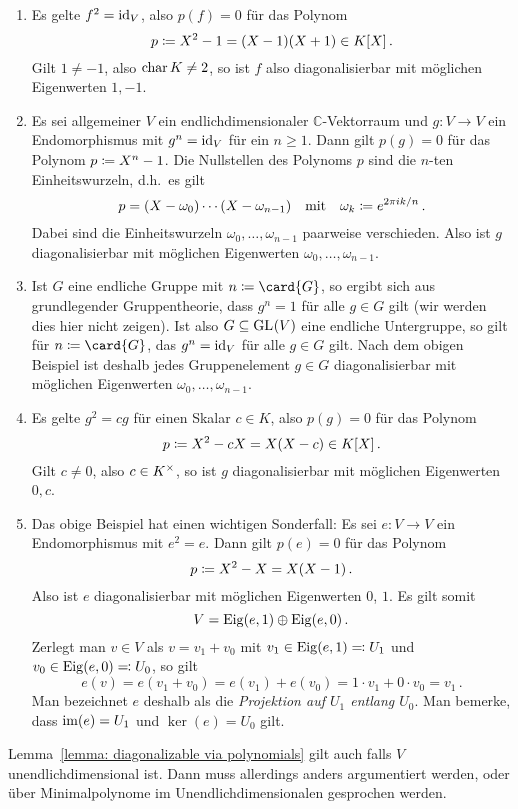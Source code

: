 \begin{example}
  \label{example: diagonalizable via polynomials}
  \leavevmode
  \begin{enumerate}
    \item
      Es gelte $f^2 = \operatorname{id}_V$, also $p(f) = 0$ für das Polynom
      \[
                  p
        \coloneqq  X^2 - 1
        =         (X - 1)(X + 1)
        \in       K[X] \,.
      \]
      Gilt $1 \neq -1$, also $\operatorname{char}{K} \neq 2$, so ist $f$ also diagonalisierbar mit möglichen Eigenwerten $1, -1$.
    \item
      Es sei allgemeiner $V$ ein endlichdimensionaler $\mathbb{C}$-Vektorraum und $g \colon V \to V$ ein Endomorphismus mit $g^n = \operatorname{id}_V$ für ein $n \geq 1$.
      Dann gilt $p(g) = 0$ für das Polynom $p \coloneqq X^n - 1$.
      Die Nullstellen des Polynoms $p$ sind die $n$-ten Einheitswurzeln, d.h.\ es gilt
      \[
        p = (X - \omega_0) \dotsm (X - \omega_{n-1})
        \quad\text{mit}\quad
        \omega_k \coloneqq e^{2 \pi i k / n} \,.
      \]
      Dabei sind die Einheitswurzeln $\omega_0, \dotsc, \omega_{n-1}$ paarweise verschieden.
      Also ist $g$ diagonalisierbar mit möglichen Eigenwerten $\omega_0, \dotsc, \omega_{n-1}$.
    \item
      Ist $G$ eine endliche Gruppe mit $n \defined \card{G}$, so ergibt sich aus grundlegender Gruppentheorie, dass $g^n = 1$ für alle $g \in G$ gilt (wir werden dies hier nicht zeigen).
      Ist also $G \subseteq \operatorname{GL}_{}(V)$ eine endliche Untergruppe, so gilt für $n \defined \card{G}$, das $g^n = \operatorname{id}_V$ für alle $g \in G$ gilt.
      Nach dem obigen Beispiel ist deshalb jedes Gruppenelement $g \in G$ diagonalisierbar mit möglichen Eigenwerten $\omega_0, \dotsc, \omega_{n-1}$.
    \item
      Es gelte $g^2 = cg$ für einen Skalar $c \in K$, also $p(g) = 0$ für das Polynom
      \[
                  p
        \coloneqq  X^2 - cX
        =         X(X-c)
        \in       K[X] \,.
      \]
      Gilt $c \neq 0$, also $c \in K^\times$, so ist $g$ diagonalisierbar mit möglichen Eigenwerten $0, c$.
    \item
      Das obige Beispiel hat einen wichtigen Sonderfall:
      Es sei $e \colon V \to V$ ein Endomorphismus mit $e^2 = e$.
      Dann gilt $p(e) = 0$ für das Polynom
      \[
                  p
        \coloneqq  X^2 - X
        =         X(X-1) \,.
      \]
      Also ist $e$ diagonalisierbar mit möglichen Eigenwerten $0$, $1$.
      Es gilt somit
      \[
        V = \operatorname{Eig}(e, 1) \oplus \operatorname{Eig}(e, 0) \,.
      \]
      Zerlegt man $v \in V$ als $v = v_1 + v_0$ mit $v_1 \in \operatorname{Eig}(e, 1) \eqqcolon U_1$ und $v_0 \in \operatorname{Eig}(e, 0) \eqqcolon U_0$, so gilt
      \[
          e(v)
        = e(v_1 + v_0)
        = e(v_1) + e(v_0)
        = 1 \cdot v_1 + 0 \cdot v_0
        = v_1 \,.
      \]
      Man bezeichnet $e$ deshalb als die \emph{Projektion auf $U_1$ entlang $U_0$}.
      Man bemerke, dass $\operatorname{im}(e) = U_1$ und $\ker(e) = U_0$ gilt.
  \end{enumerate}
\end{example}

\begin{remark}
  Lemma~\ref{lemma: diagonalizable via polynomials} gilt auch falls $V$ unendlichdimensional ist.
  Dann muss allerdings anders argumentiert werden, oder über Minimalpolynome im Unendlichdimensionalen gesprochen werden.
\end{remark}







